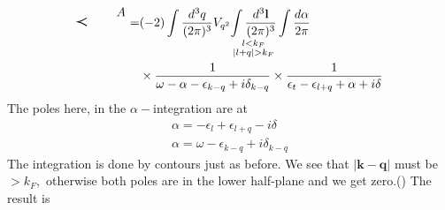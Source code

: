 \begin{equation}
\begin{aligned}
\begin{tikzpicture}[x=0.65pt,y=0.65pt,yscale=-1,xscale=1]
\draw [shift={(384.57,61.11)}, rotate = 0] [color={rgb, 255:red, 0; green, 0; blue, 0 }  ][line width=0.75]    (10.93,-4.9) .. controls (6.95,-2.3) and (3.31,-0.67) .. (0,0) .. controls (3.31,0.67) and (6.95,2.3) .. (10.93,4.9)   ;

\draw (431,42) node [anchor=north west][inner sep=0.75pt]    {$A$};


\end{tikzpicture}=&(-2) \int \frac{d^{3} q}{(2 \pi)^{3}} V_{q^{2}} \underset{\substack{l<k_F\\|l+q|>k_F}}{\int \frac{d^{3} \mathbf{l}}{(2 \pi)^{3}}} \int \frac{d \alpha}{2 \pi} \\
&\times \frac{1}{\omega-\alpha-\epsilon_{k-q}+i \delta_{k-q}} \times \frac{1}{\epsilon_{t}-\epsilon_{l+q}+\alpha+i \delta}
    \end{aligned}
\end{equation}
The poles here, in the $\alpha-$integration are at
$$\begin{array}{l}
\alpha=-\epsilon_{l}+\epsilon_{l+q}-i \delta \\
\alpha=\omega-\epsilon_{k-q}+i \delta_{k-q}
\end{array}$$
The integration is done by contours just as before. We see that $|\mathbf{k}-\mathbf{q}|$ must be $>k_{F},$ otherwise both poles are in the lower half-plane and we get zero.() The result is
